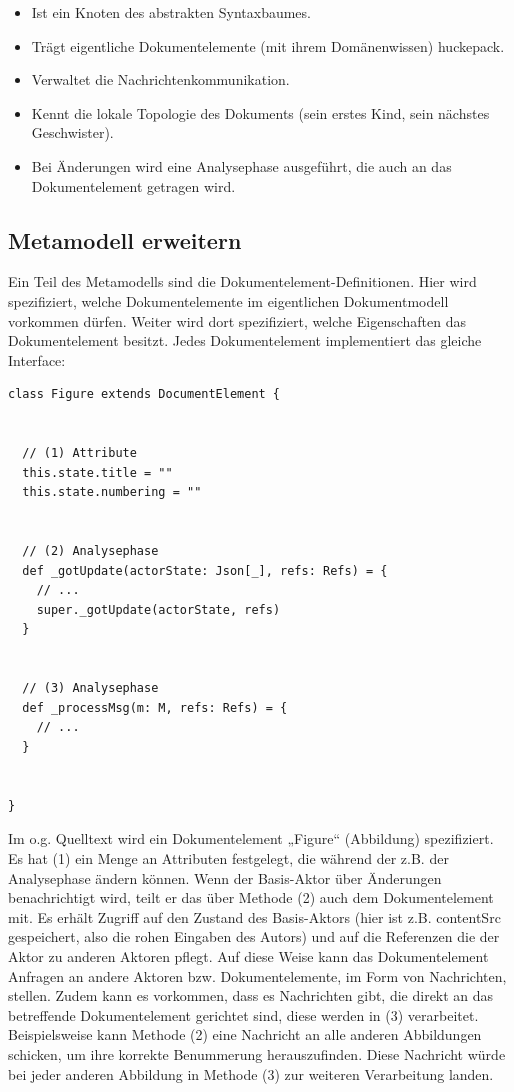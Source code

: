  
\begin{itemize}

\item Ist ein Knoten des abstrakten Syntaxbaumes.
\item Trägt eigentliche Dokumentelemente (mit ihrem Domänenwissen) huckepack.
\item Verwaltet die Nachrichtenkommunikation.
\item Kennt die lokale Topologie des Dokuments (sein erstes Kind, sein nächstes Geschwister).
\item Bei Änderungen wird eine Analysephase ausgeführt, die auch an das Dokumentelement getragen wird.
\end{itemize}
 
\subsection{Metamodell erweitern}\label{metamodell-impl}
 
Ein Teil des Metamodells sind die Dokumentelement-Definitionen. Hier wird spezifiziert, welche Dokumentelemente im eigentlichen Dokumentmodell vorkommen dürfen. Weiter wird dort spezifiziert, welche Eigenschaften das Dokumentelement besitzt. Jedes Dokumentelement implementiert das gleiche Interface:

 
\begin{verbatim}
class Figure extends DocumentElement {


  // (1) Attribute
  this.state.title = ""
  this.state.numbering = ""


  // (2) Analysephase
  def _gotUpdate(actorState: Json[_], refs: Refs) = {
    // ...
    super._gotUpdate(actorState, refs)
  }


  // (3) Analysephase
  def _processMsg(m: M, refs: Refs) = {
    // ...
  }


}
\end{verbatim}
 
Im o.g. Quelltext wird ein Dokumentelement „Figure“ (Abbildung) spezifiziert. Es hat (1) ein Menge an Attributen festgelegt, die während der z.B. der Analysephase ändern können. Wenn der Basis-Aktor über Änderungen benachrichtigt wird, teilt er das über Methode (2) auch dem Dokumentelement mit. Es erhält Zugriff auf den Zustand des Basis-Aktors (hier ist z.B. contentSrc gespeichert, also die rohen Eingaben des Autors) und auf die Referenzen die der Aktor zu anderen Aktoren pflegt. Auf diese Weise kann das Dokumentelement Anfragen an andere Aktoren bzw. Dokumentelemente, im Form von Nachrichten, stellen. Zudem kann es vorkommen, dass es Nachrichten gibt, die direkt an das betreffende Dokumentelement gerichtet sind, diese werden in (3) verarbeitet. Beispielsweise kann Methode (2) eine Nachricht an alle anderen Abbildungen schicken, um ihre korrekte Benummerung herauszufinden. Diese Nachricht würde bei jeder anderen Abbildung in Methode (3) zur weiteren Verarbeitung landen.

